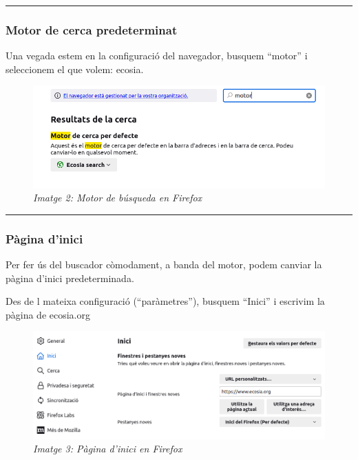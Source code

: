 \documentclass[
  a4paper,
]{article}
\begin{document}
\begin{center}\rule{0.5\linewidth}{0.5pt}\end{center}

\subsubsection{Motor de cerca
predeterminat}\label{motor-de-cerca-predeterminat}

Una vegada estem en la configuració del navegador, busquem ``motor'' i
seleccionem el que volem: ecosia.

\begin{figure}
\centering
\includegraphics{png/2-Firefox-Motor.png}
\caption{\emph{Imatge 2: Motor de búsqueda en Firefox}}
\end{figure}

\begin{center}\rule{0.5\linewidth}{0.5pt}\end{center}

\subsubsection{Pàgina d'inici}\label{puxe0gina-dinici}

Per fer ús del buscador còmodament, a banda del motor, podem canviar la
pàgina d'inici predeterminada.

Des de l mateixa configuració (``paràmetres''), busquem ``Inici'' i
escrivim la pàgina de ecosia.org

\begin{figure}
\centering
\includegraphics{png/3-Firefox-Inici.png}
\caption{\emph{Imatge 3: Pàgina d'inici en Firefox}}
\end{figure}
\end{document}
